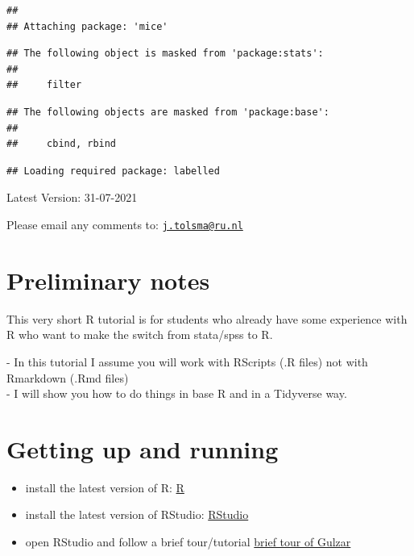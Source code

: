 \documentclass[
]{book}
\providecommand{\tightlist}{%
  \setlength{\itemsep}{0pt}\setlength{\parskip}{0pt}}
\begin{document}
\begin{verbatim}
## 
## Attaching package: 'mice'
\end{verbatim}

\begin{verbatim}
## The following object is masked from 'package:stats':
## 
##     filter
\end{verbatim}

\begin{verbatim}
## The following objects are masked from 'package:base':
## 
##     cbind, rbind
\end{verbatim}

\begin{verbatim}
## Loading required package: labelled
\end{verbatim}

Latest Version: 31-07-2021

Please email any comments to: \href{mailto:j.tolsma@ru.nl}{\nolinkurl{j.tolsma@ru.nl}}

\hypertarget{preliminary-notes}{%
\section{Preliminary notes}\label{preliminary-notes}}

This very short R tutorial is for students who already have some experience with R who want to make the switch from stata/spss to R.

- In this tutorial I assume you will work with RScripts (.R files) not with Rmarkdown (.Rmd files)\\
- I will show you how to do things in base R and in a Tidyverse way.

\hypertarget{getting-up-and-running}{%
\section{Getting up and running}\label{getting-up-and-running}}

\begin{itemize}
\tightlist
\item
  install the latest version of R: \href{https://cran.r-project.org/}{R}
\item
  install the latest version of RStudio: \href{www.rstudio.com}{RStudio}
\item
  open RStudio and follow a brief tour/tutorial \href{https://web.cs.ucla.edu/~gulzar/rstudio/basic-tutorial.html}{brief tour of Gulzar}
\end{itemize}
\end{document}
